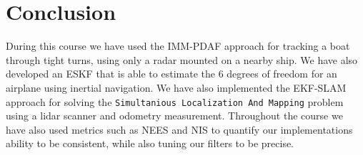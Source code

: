 \section{Conclusion}
During this course we have used the IMM-PDAF approach for tracking a boat through tight turns, using only a radar mounted on a nearby ship. We have also developed an ESKF that is able to estimate the 6 degrees of freedom for an airplane using inertial navigation. We have also implemented the EKF-SLAM approach for solving the \texttt{Simultanious Localization And Mapping} problem using a lidar scanner and odometry measurement. Throughout the course we have also used metrics such as NEES and NIS to quantify our implementations ability to be consistent, while also tuning our filters to be precise.
